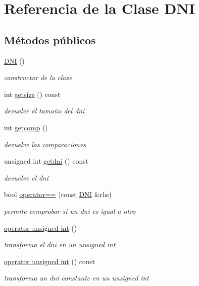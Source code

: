 \hypertarget{classDNI}{}\section{Referencia de la Clase D\+NI}
\label{classDNI}
\subsection*{Métodos públicos}
\begin{DoxyCompactItemize}
\item 
\hyperlink{classDNI_ad3a35b9da7523fc858a84cf2f78271c2}{D\+NI} ()
\begin{DoxyCompactList}\small\item\em constructor de la clase \end{DoxyCompactList}\item 
int \hyperlink{classDNI_a3e38336648ba2cea219c0558198fb7c4}{getsize} () const
\begin{DoxyCompactList}\small\item\em devuelve el tamaño del dni \end{DoxyCompactList}\item 
int \hyperlink{classDNI_ad03d2487ed8896fd5a526f8427092931}{getcomp} ()
\begin{DoxyCompactList}\small\item\em devuelve las comparaciones \end{DoxyCompactList}\item 
\mbox{\label{classDNI_a68a88b94dfd81117a3dd3df620d9a0f3}} 
unsigned int \hyperlink{classDNI_a68a88b94dfd81117a3dd3df620d9a0f3}{getdni} () const
\begin{DoxyCompactList}\small\item\em devuelve el dni \end{DoxyCompactList}\item 
bool \hyperlink{classDNI_ab2d1d81aa60a3463b88f6bf0b9ff7b8c}{operator==} (const \hyperlink{classDNI}{D\+NI} \&rhs)
\begin{DoxyCompactList}\small\item\em permite comprobar si un dni es igual a otro \end{DoxyCompactList}\item 
\hyperlink{classDNI_a15f0d23d04bb88088f095288a82605cf}{operator unsigned int} ()
\begin{DoxyCompactList}\small\item\em transforma el dni en un unsigned int \end{DoxyCompactList}\item 
\hyperlink{classDNI_a8916089b50d31fd9e07c0adac1073153}{operator unsigned int} () const
\begin{DoxyCompactList}\small\item\em transforma un dni constante en un unsigned int \end{DoxyCompactList}\end{DoxyCompactItemize}

